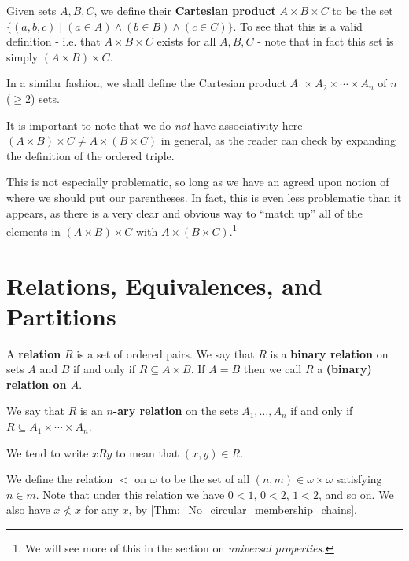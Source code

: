 \begin{defn}
\label{Defn:_Product_of_n_sets}
Given sets $A, B, C$, we define their \textbf{Cartesian product} $A\times B\times C$ to be the set $\{(a, b, c)\mid (a\in A) \land (b\in B)\land (c\in C)\}$. To see that this is a valid definition - i.e. that $A\times B\times C$ exists for all $A, B, C$ - note that in fact this set is simply $(A\times B)\times C$. 

In a similar fashion, we shall define the Cartesian product $A_1\times A_2\times \cdots \times A_n$ of $n$ ($\geq 2$) sets.
\end{defn}

It is important to note that we do \emph{not} have associativity here - $(A\times B)\times C\neq A\times (B \times C)$ in general, as the reader can check by expanding the definition of the ordered triple.

This is not especially problematic, so long as we have an agreed upon notion of where we should put our parentheses. In fact, this is even less problematic than it appears, as there is a very clear and obvious way to \enquote{match up} all of the elements in $(A\times B)\times C$ with $A\times (B\times C)$.\footnote{We will see more of this in the section on \emph{universal properties}.} 

\section{Relations, Equivalences, and Partitions}
\label{--Sec:_Relations_Equivalences_and_Partitions}

\begin{defn}
\label{Defn_(n-ary)_Relation}

A \textbf{relation} $R$ is a set of ordered pairs. We say that $R$ is a \textbf{binary relation} on sets $A$ and $B$ if and only if $R\subseteq A\times B$. If $A=B$ then we call $R$ a \textbf{(binary) relation on $A$}.

We say that $R$ is an \textbf{$n$-ary relation} on the sets $A_1,\dots, A_n$ if and only if $R\subseteq A_1\times\cdots\times A_n$.

We tend to write $xRy$ to mean that $(x, y)\in R$.
\end{defn}

\begin{example} 
\label{Example:_Defining_less_than_on_N}
We define the relation $<$ on $\omega$ to be the set of all $(n, m)\in \omega\times \omega$ satisfying $n\in m$. Note that under this relation we have $0<1$, $0<2$, $1<2$, and so on. We also have $x\nless x$ for any $x$, by \autoref{Thm:_No_circular_membership_chains}.
\end{example}


